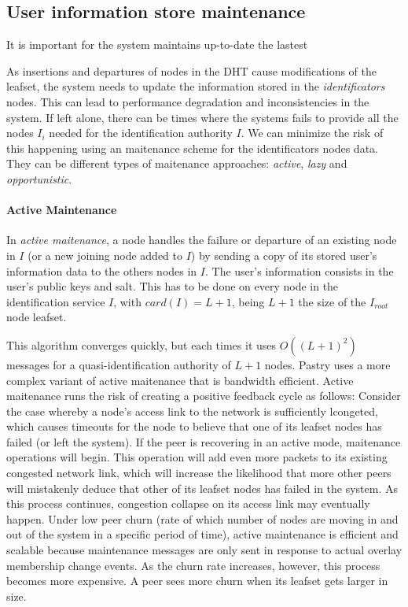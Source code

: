 \subsection{User information store maintenance}
\label{sec:lazy_node_maintenance}

It is important for the system maintains up-to-date the lastest 

As insertions and departures of nodes in the DHT cause modifications of the
leafset, the system needs to update the information stored in the
\textit{identificators} nodes. This can lead to performance degradation and inconsistencies in the
system. If left alone, there can be times where the systems
fails to provide all the nodes $I_i$ needed for the identification authority
$I$. We can minimize the risk of this happening using an maitenance scheme for
the identificators nodes data. They can be different types of maitenance approaches:
\textit{active}, \textit{lazy} and \textit{opportunistic}.

\paragraph{Active Maintenance}
  In \textit{active maitenance}, a
node handles the failure or departure of an existing node in $I$ (or a new
joining node added to $I$) by sending a copy of its stored user's
information data to the others nodes in $I$.
The user's information consists in the user's public keys and salt. This has to be done on every node in the identification service
$I$, with $card(I) = L+1$, being $L+1$ the size of the $I_{root}$ node leafset.

 This algorithm converges quickly, but each times it uses $O((L+1)^2)$ messages
for a quasi-identification authority of $L+1$ nodes.
Pastry uses a more complex variant of active maitenance that is
bandwidth efficient.
Active maitenance runs the risk of creating a positive feedback cycle as
follows: Consider the case whereby a node's access link to the network is
sufficiently lcongeted, which causes timeouts for the node to believe that one
of its leafset nodes has failed (or left the system). If the peer is recovering
in an active mode, maitenance operations will begin. This operation will add
even more packets to its existing congested network link, which will increase
the likelihood that more other peers will mistakenly deduce that other of its leafset
nodes has failed in the system. As this process continues, congestion collapse
on its access link may eventually happen.
Under low peer churn (rate of which number of nodes are moving in and out of the
system in a specific period of time), active maintenance is efficient and scalable because
maintenance messages are only sent in response to actual overlay membership
change events. As the churn rate increases, however, this process becomes more
expensive. A peer sees more churn when its leafset gets larger in size.

